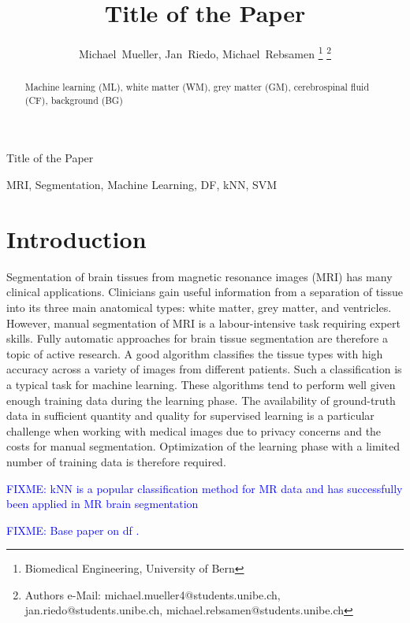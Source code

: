 \documentclass[journal]{IEEEtran}
\newcommand\FIXME[1]{\textcolor{blue}{FIXME: #1}}
\begin{document}
\title{Title of the Paper}


\author{Michael~Mueller,
        Jan~Riedo,
        Michael~Rebsamen%
\thanks{Biomedical Engineering, University of Bern}%
\thanks{Authors e-Mail: michael.mueller4@students.unibe.ch, jan.riedo@students.unibe.ch, michael.rebsamen@students.unibe.ch}}%
%
{Title of the Paper}
\maketitle

\begin{abstract}
Machine learning (ML), white matter (WM), grey matter (GM), cerebrospinal fluid (CF), background (BG)
\end{abstract}
\begin{IEEEkeywords}
MRI, Segmentation, Machine Learning, DF, kNN, SVM
\end{IEEEkeywords}


\section{Introduction}
Segmentation of brain tissues from magnetic resonance images (MRI) has many clinical applications. Clinicians gain useful information from a separation of tissue into its three main anatomical types: white matter, grey matter, and ventricles. However, manual segmentation of MRI is a labour-intensive task requiring expert skills. Fully automatic approaches for brain tissue segmentation are therefore a topic of active research. A good algorithm classifies the tissue types with high accuracy across a variety of images from different patients. Such a classification is a typical task for machine learning. These algorithms tend to perform well given enough training data during the learning phase. The availability of ground-truth data in sufficient quantity and quality for supervised learning is a particular challenge when working with medical images due to privacy concerns and the costs for manual segmentation. Optimization of the learning phase with a limited number of training data is therefore required.

\FIXME{kNN is a popular classification method for MR data and has successfully been applied in MR brain segmentation\cite{Anbeek2004,Cocosco2003,Warfield2000}}

\FIXME{Base paper on df \cite{Breiman2001}.}
\end{document}

